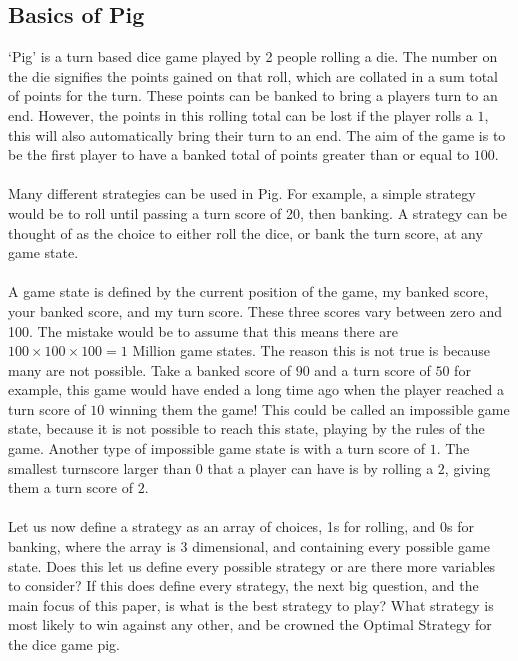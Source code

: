 \documentclass[a4paper,titlepage]{article}
\begin{document}
\subsection{Basics of Pig}
`Pig' is a turn based dice game played by 2 people rolling a die. The number on the die signifies the points gained on that roll,
which are collated in a sum total of points for the turn. These points can be banked to bring a players turn to an end.
However, the points in this rolling total can be lost if the player rolls a $1$, this will also automatically bring their turn to an end.
The aim of the game is to be the first player to have a banked total of points greater than or equal to $100$.
\\
\\
Many different strategies can be used in Pig. For example, a simple strategy would be to roll until passing a turn score of 20, then banking.
A strategy can be thought of as the choice to either roll the dice, or bank the turn score, at any game state.
\\
\\
A game state is defined by the current position of the game, my banked score, your banked score, and my turn score.
These three scores vary between zero and 100. The mistake would be to assume that this means there are $100\times100\times100 = 1$ Million
game states. The reason this is not true is because many are not possible. Take a banked score of $90$ and a turn score of $50$ for example,
this game would have ended a long time ago when the player reached a turn score of $10$ winning them the game! This could be called an impossible
game state, because it is not possible to reach this state, playing by the rules of the game. Another type of impossible game state is
with a turn score of $1$. The smallest turnscore larger than $0$ that a player can have is by rolling a $2$, giving them a turn score of $2$.
\\
\\
Let us now define a strategy as an array of choices, 1s for rolling, and 0s for banking, where the array is 3 dimensional, and containing every
possible game state.
Does this let us define every possible strategy or are there more variables to consider?
If this does define every strategy, the next big question, and the main focus of this paper, is what is the best strategy to play?
What strategy is most likely to win against any other, and be crowned the Optimal Strategy for the dice game pig.
\\
\\
\end{document}
